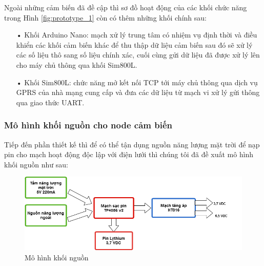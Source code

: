 Ngoài những cảm biến đã đề cập thì sơ đồ hoạt động của các khối chức năng trong Hình \ref{fig:prototype_1} còn có thêm những khối chính sau:
\begin{itemize}
	\item[•] Khối Arduino Nano: mạch xử lý trung tâm có nhiệm vụ định thời và điều khiển các khối cảm biến khác để thu thập dữ liệu cảm biến sau đó sẽ xử lý các số liệu thô sang số liệu chính xác, cuối cùng gửi dữ liệu đã được xử lý lên cho máy chủ thông qua khối Sim800L.
	\item[•] Khối Sim800L: chức năng mở kết nối TCP tới máy chủ thông qua dịch vụ GPRS của nhà mạng cung cấp và đưa các dữ liệu từ mạch vi xử lý gửi thông qua giao thức UART.
\end{itemize}



\subsubsection*{Mô hình khối nguồn cho node cảm biến}
Tiếp đến phần thiết kế thì để có thể tận dụng nguồn năng lượng mặt trời để nạp pin cho mạch hoạt động độc lập với điện lưới thì chúng tôi đã đề xuất mô hình khối nguồn như sau:
\begin{figure}[H]
	\centering    
	\includegraphics[width=6in]{khoinguon}
	\caption[Mô hình khối nguồn]{Mô hình khối nguồn}
	\label{fig:khoinguon}
\end{figure}

